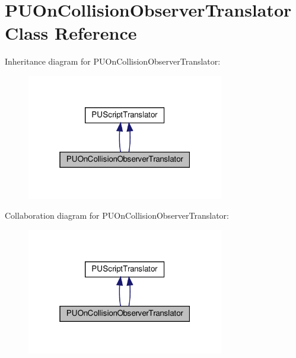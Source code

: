 \hypertarget{classPUOnCollisionObserverTranslator}{}\section{P\+U\+On\+Collision\+Observer\+Translator Class Reference}
\label{classPUOnCollisionObserverTranslator}


Inheritance diagram for P\+U\+On\+Collision\+Observer\+Translator\+:
\nopagebreak
\begin{figure}[H]
\begin{center}
\leavevmode
\includegraphics[width=244pt]{classPUOnCollisionObserverTranslator__inherit__graph}
\end{center}
\end{figure}


Collaboration diagram for P\+U\+On\+Collision\+Observer\+Translator\+:
\nopagebreak
\begin{figure}[H]
\begin{center}
\leavevmode
\includegraphics[width=244pt]{classPUOnCollisionObserverTranslator__coll__graph}
\end{center}
\end{figure}
